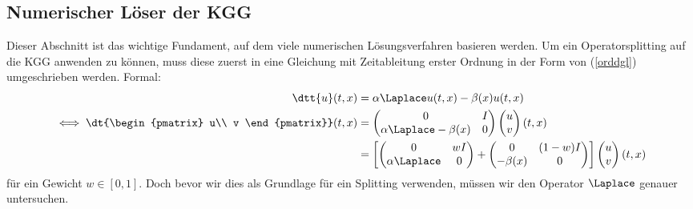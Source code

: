 \subsection{Numerischer Löser der KGG}
Dieser Abschnitt ist das wichtige Fundament, auf dem viele numerischen Lösungsverfahren basieren werden. Um ein Operatorsplitting auf die KGG anwenden zu können, muss diese zuerst in eine Gleichung mit Zeitableitung erster Ordnung in der Form von (\ref{orddgl}) umgeschrieben werden. Formal:
\begin{align}
\dtt{u}(t,x)&=\alpha \Laplace u(t,x) - \beta(x)u(t,x)\nonumber\\
\iff
\dt{\begin{pmatrix}
u\\
v
\end{pmatrix}}(t,x)&=
\begin{pmatrix}
0 & I\\
\alpha \Laplace - \beta(x) & 0
\end{pmatrix}
\begin{pmatrix}u\\v\end{pmatrix}(t,x)\nonumber\\
\label{eqn:formalsplit_kgg}
&=\left[\begin{pmatrix} 0 & wI\\ \alpha \Laplace & 0\end{pmatrix} 
+ \begin{pmatrix} 0 & (1-w)I\\ -\beta(x) & 0\end{pmatrix}\right]
\begin{pmatrix}u\\v\end{pmatrix}(t,x)
\end{align}
für ein Gewicht $w\in [0,1]$. Doch bevor wir dies als Grundlage für ein Splitting verwenden, müssen wir den Operator $\Laplace$ genauer untersuchen.
